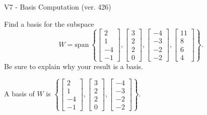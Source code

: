 \begin{exercise}
  \begin{exerciseTitle}V7 - Basis Computation (ver. 426)\end{exerciseTitle}
  \begin{exerciseStatement}
    Find a basis for the subspace 
\[W=\mathrm{span}\ \left\{\left[\begin{array}{r}
2 \\
1 \\
-4 \\
-1
\end{array}\right] , \left[\begin{array}{r}
3 \\
2 \\
2 \\
0
\end{array}\right] , \left[\begin{array}{r}
-4 \\
-3 \\
-2 \\
-2
\end{array}\right] , \left[\begin{array}{r}
11 \\
8 \\
6 \\
4
\end{array}\right]\right\}.\]
 Be sure to explain why your result is a basis.


  \end{exerciseStatement}
  \begin{exerciseAnswer}
   A basis of \(W\) is  \(\left\{\left[\begin{array}{r}
2 \\
1 \\
-4 \\
-1
\end{array}\right] , \left[\begin{array}{r}
3 \\
2 \\
2 \\
0
\end{array}\right] , \left[\begin{array}{r}
-4 \\
-3 \\
-2 \\
-2
\end{array}\right]\right\}\).
  


  \end{exerciseAnswer}
\end{exercise}